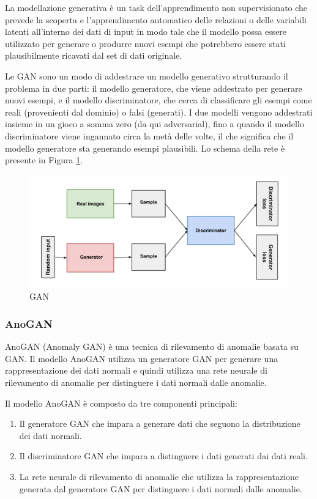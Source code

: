 La modellazione generativa è un task dell'apprendimento non supervisionato che prevede la scoperta e l'apprendimento automatico delle relazioni o delle variabili latenti all'interno dei dati di input in modo tale che il modello possa essere utilizzato per generare o produrre nuovi esempi che potrebbero essere stati plausibilmente ricavati dal set di dati originale.

Le GAN sono un modo di addestrare un modello generativo strutturando il problema in due parti: il modello generatore, che viene addestrato per generare nuovi esempi, e il modello discriminatore, che cerca di classificare gli esempi come reali (provenienti dal dominio) o falsi (generati). I due modelli vengono addestrati insieme in un gioco a somma zero (da qui adversarial), fino a quando il modello discriminatore viene ingannato circa la metà delle volte, il che significa che il modello generatore sta generando esempi plausibili. Lo schema della rete è presente in Figura \ref{gan}.
\begin{figure}[t]
	\centering
	\includegraphics[width=12cm, scale=1]{images/gan}
	\caption{GAN}
	\label{gan}
\end{figure}

\subsubsection{AnoGAN}
AnoGAN (Anomaly GAN) \cite{schlegl2017unsupervised} è una tecnica di rilevamento di anomalie basata su GAN. Il modello AnoGAN utilizza un generatore GAN per generare una rappresentazione dei dati normali e quindi utilizza una rete neurale di rilevamento di anomalie per distinguere i dati normali dalle anomalie.

Il modello AnoGAN è composto da tre componenti principali:

\begin{enumerate}
\item Il generatore GAN che impara a generare dati che seguono la distribuzione dei dati normali.
\item Il discriminatore GAN che impara a distinguere i dati generati dai dati reali.
\item La rete neurale di rilevamento di anomalie che utilizza la rappresentazione generata dal generatore GAN per distinguere i dati normali dalle anomalie.
\end{enumerate}


